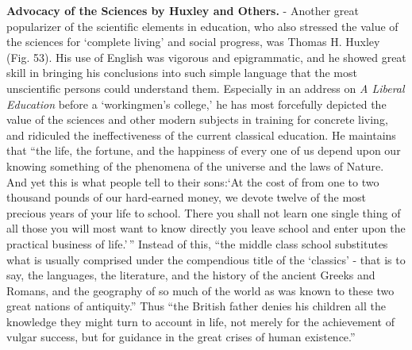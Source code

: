 \documentclass[
]{book}
\begin{document}
\textbf{Advocacy of the Sciences by Huxley and Others.} - Another great popularizer of the scientific elements in education, who also stressed the value of the sciences for `complete living' and social progress, was Thomas H. Huxley (Fig. 53). His use of English was vigorous and epigrammatic, and he showed great skill in bringing his conclusions into such simple language that the most unscientific persons could understand them. Especially in an address on \emph{A Liberal Education} before a `workingmen's college,' he has most forcefully depicted the value of the sciences and other modern subjects in training for concrete living, and ridiculed the ineffectiveness of the current classical education. He maintains that ``the life, the fortune, and the happiness of every one of us depend upon our knowing something of the phenomena of the universe and the laws of Nature. And yet this is what people tell to their sons:`At the cost of from one to two thousand pounds of our hard-earned money, we devote twelve of the most precious years of your life to school. There you shall not learn one single thing of all those you will most want to know directly you leave school and enter upon the practical business of life.'\,'' Instead of this, ``the middle class school substitutes what is usually comprised under the compendious title of the `classics' - that is to say, the languages, the literature, and the history of the ancient Greeks and Romans, and the geography of so much of the world as was known to these two great nations of antiquity.'' Thus ``the British father denies his children all the knowledge they might turn to account in life, not merely for the achievement of vulgar success, but for guidance in the great crises of human existence.''
\end{document}
